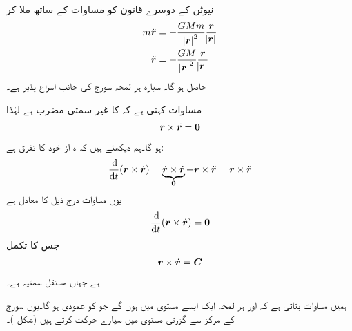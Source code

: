 نیوٹن کے دوسرے قانون   کو مساوات  کے ساتھ ملا کر
\begin{align}
m\ddot{{{\boldsymbol{r}}}}&=-\frac{GMm}{\abs{{{\boldsymbol{r}}}}^2}\frac{{{\boldsymbol{r}}}}{\abs{{{\boldsymbol{r}}}}}\nonumber\\
\ddot{{{\boldsymbol{r}}}}&=-\frac{GM}{\abs{{{\boldsymbol{r}}}}^2}\frac{{{\boldsymbol{r}}}}{\abs{{{\boldsymbol{r}}}}}\label{مساوات_سمتی_تفاعل_قوت_تجاذب_ب}
\end{align}
حاصل  ہو گا۔ سیارہ ہر لمحہ سورج کی جانب اسراع پذیر   ہے۔

مساوات  کہتی ہے کہ  کا غیر سمتی مضرب  ہے لہٰذا 
\begin{align}\label{مساوات_سمتی_تفاعل_قوت_تجاذب_پ}
{\ensuremath{{\boldsymbol{r}}}}\times\ddot{{{\boldsymbol{r}}}}={{\boldsymbol{0}}}
\end{align}
ہو گا۔ہم دیکھتے  ہیں کہ ہ   از خود  کا تفرق ہے:
\begin{align}\label{مساوات_سمتی_تفاعل_قوت_تجاذب_ت}
\frac{\dif}{\dif t}(\kvec{r}\times\dot{\kvec{r}})=\underbrace{\dot{\kvec{r}}\times \dot{\kvec{r}}}_{\kvec{0}}+\kvec{r}\times\ddot{\kvec{r}}=\kvec{r}\times\ddot{\kvec{r}}
\end{align}
یوں مساوات  درج ذیل کا  معادل ہے
\begin{align}\label{مساوات_سمتی_تفاعل_قوت_تجاذب_ٹ}
\frac{\dif}{\dif t}(\kvec{r}\times\dot{\kvec{r}})=\kvec{0}
\end{align}
جس کا تکمل
\begin{align}\label{مساوات_سمتی_تفاعل_قوت_تجاذب_ث}
{\ensuremath{{\boldsymbol{r}}}}\times\dot{{{\boldsymbol{r}}}}={{\boldsymbol{C}}}
\end{align}
ہے جہاں  مستقل سمتیہ ہے۔

ہمیں مساوات  بتاتی ہے کہ  اور  ہر لمحہ ایک ایسے مستوی میں ہوں گے جو  کو عمودی ہو گا۔یوں  سورج کے مرکز سے گزرتی  مستوی میں سیارے  حرکت کرتے ہیں (شکل )۔

